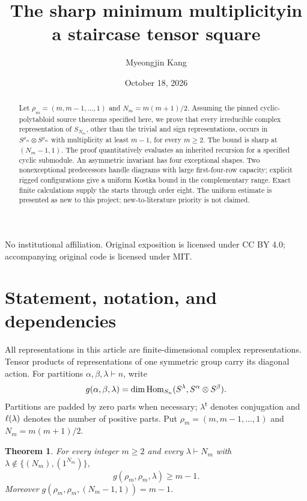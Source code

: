\documentclass[11pt]{article}
\title{The sharp minimum multiplicity\linebreak in a staircase tensor square}
\author{Myeongjin Kang}\date{October 18, 2026}
\newtheorem{theorem}{Theorem}[section]
\theoremstyle{remark}\newtheorem{remark}[theorem]{Remark}
\newcommand{\trp}{\mathsf t}\newcommand{\eps}{\varepsilon}
\numberwithin{equation}{section}\setlength{\emergencystretch}{2em}
\begin{document}
\maketitle
\begin{abstract}
Let $\rho_m=(m,m-1,\ldots,1)$ and $N_m=m(m+1)/2$.
Assuming the pinned cyclic-polytabloid source theorems specified here,
we prove that every irreducible complex representation of $S_{N_m}$,
other than the trivial and sign representations, occurs in
$S^{\rho_m}\otimes S^{\rho_m}$ with multiplicity at least $m-1$,
for every $m\ge2$. The bound is sharp at $(N_m-1,1)$.
The proof quantitatively evaluates an inherited recursion for a specified
cyclic submodule. An asymmetric invariant has four exceptional shapes.
Two nonexceptional predecessors handle diagrams with large first-four-row
capacity; explicit rigged configurations give a uniform Kostka bound in
the complementary range. Exact finite calculations supply the starts through
order eight. The uniform estimate is presented as new to this project;
new-to-literature priority is not claimed.
\end{abstract}
\noindent\small No institutional affiliation. Original exposition is licensed under
CC BY 4.0; accompanying original code is licensed under MIT.\normalsize
\tableofcontents

\section{Statement, notation, and dependencies}\label{sec:intro}
All representations in this article are finite-dimensional complex
representations. Tensor products of representations of one symmetric group
carry its diagonal action. For partitions $\alpha,\beta,\lambda\vdash n$, write
\[
 g(\alpha,\beta,\lambda)
 =\dim\operatorname{Hom}_{S_n}(S^\lambda,S^\alpha\otimes S^\beta).
\]
Partitions are padded by zero parts when necessary; $\lambda^{\trp}$ denotes
conjugation and $\ell(\lambda)$ denotes the number of positive parts.
Put $\rho_m=(m,m-1,\ldots,1)$ and $N_m=m(m+1)/2$.

\begin{theorem}\label{thm:main}
For every integer $m\ge2$ and every $\lambda\vdash N_m$ with
$\lambda\notin\{(N_m),(1^{N_m})\}$,
\begin{equation}\label{eq:main}
 g(\rho_m,\rho_m,\lambda)\ge m-1.
\end{equation}
Moreover $g(\rho_m,\rho_m,(N_m-1,1))=m-1$.
\end{theorem}
\end{document}
